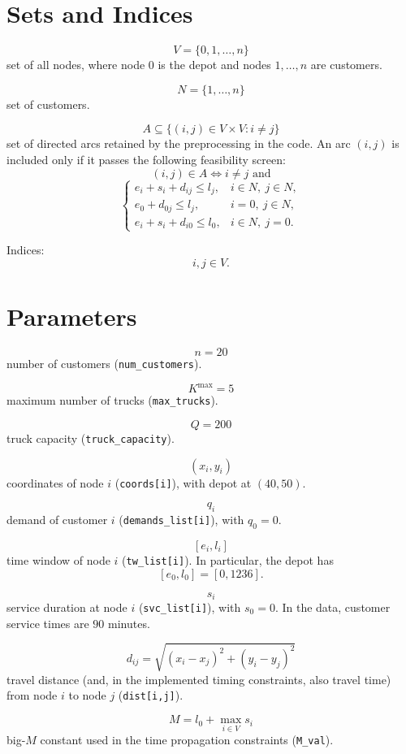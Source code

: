 \section*{Sets and Indices}

\[
V=\{0,1,\dots,n\}
\]
set of all nodes, where node \(0\) is the depot and nodes \(1,\dots,n\) are customers.

\[
N=\{1,\dots,n\}
\]
set of customers.

\[
A \subseteq \{(i,j)\in V\times V : i\neq j\}
\]
set of directed arcs retained by the preprocessing in the code. An arc \((i,j)\) is included only if it passes the following feasibility screen:
\[
(i,j)\in A \iff i\neq j \text{ and}
\]
\[
\begin{cases}
e_i+s_i+d_{ij}\le l_j, & i\in N,\ j\in N,\\
e_0+d_{0j}\le l_j, & i=0,\ j\in N,\\
e_i+s_i+d_{i0}\le l_0, & i\in N,\ j=0.
\end{cases}
\]

Indices:
\[
i,j \in V.
\]

\section*{Parameters}

\[
n=20
\]
number of customers (\texttt{num\_customers}).

\[
K^{\max}=5
\]
maximum number of trucks (\texttt{max\_trucks}).

\[
Q=200
\]
truck capacity (\texttt{truck\_capacity}).

\[
(x_i,y_i)
\]
coordinates of node \(i\) (\texttt{coords[i]}), with depot at \((40,50)\).

\[
q_i
\]
demand of customer \(i\) (\texttt{demands\_list[i]}), with \(q_0=0\).

\[
[e_i,l_i]
\]
time window of node \(i\) (\texttt{tw\_list[i]}). In particular, the depot has
\[
[e_0,l_0]=[0,1236].
\]

\[
s_i
\]
service duration at node \(i\) (\texttt{svc\_list[i]}), with \(s_0=0\). In the data, customer service times are \(90\) minutes.

\[
d_{ij}=\sqrt{(x_i-x_j)^2+(y_i-y_j)^2}
\]
travel distance (and, in the implemented timing constraints, also travel time) from node \(i\) to node \(j\) (\texttt{dist[i,j]}).

\[
M=l_0+\max_{i\in V} s_i
\]
big-\(M\) constant used in the time propagation constraints (\texttt{M\_val}).

